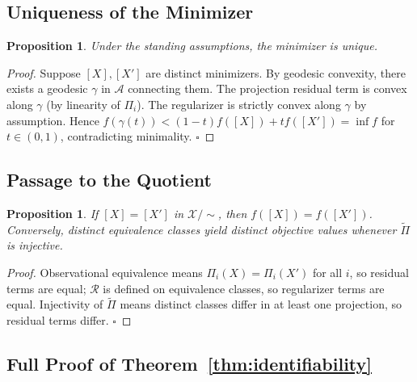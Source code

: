 \documentclass[12pt, oneside]{article}
\newtheorem{proposition}[theorem]{Proposition}
\newcommand{\Xmod}{\mathcal{X}/{\sim}}
\newcommand{\Ftil}{\widetilde{\Pi}}
\begin{document}
\subsection{Uniqueness of the Minimizer}

\begin{proposition}
Under the standing assumptions, the minimizer is unique.
\end{proposition}
\begin{proof}
Suppose $[X],[X']$ are distinct minimizers. By geodesic convexity, there exists a
geodesic $\gamma$ in $\mathcal{A}$ connecting them. The projection residual term is
convex along $\gamma$ (by linearity of $\Pi_i$). The regularizer is strictly convex along
$\gamma$ by assumption. Hence $f(\gamma(t)) < (1-t)f([X]) + tf([X']) = \inf f$ for
$t \in (0,1)$, contradicting minimality. $\square$
\end{proof}

\subsection{Passage to the Quotient}

\begin{proposition}
If $[X] = [X']$ in $\Xmod$, then $f([X]) = f([X'])$. Conversely, distinct equivalence
classes yield distinct objective values whenever $\Ftil$ is injective.
\end{proposition}
\begin{proof}
Observational equivalence means $\Pi_i(X) = \Pi_i(X')$ for all $i$, so residual terms
are equal; $\mathcal{R}$ is defined on equivalence classes, so regularizer terms are
equal. Injectivity of $\Ftil$ means distinct classes differ in at least one projection,
so residual terms differ. $\square$
\end{proof}

\subsection{Full Proof of Theorem~\ref{thm:identifiability}}
\end{document}
